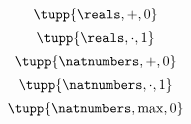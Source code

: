 {\begin{forslides}
\begin{equation}
        \end{equation}
        \begin{equation}
            \label{eq:example-monoid-reals-plus-zero}
            \tupp{\reals, +, 0}
        \end{equation}
        \begin{equation}
            \label{eq:example-monoid-reals-mult-one}
            \tupp{\reals, \cdot, 1}
        \end{equation}
        \begin{equation}
            \label{eq:example-monoid-nats-plus-zero}
            \tupp{\natnumbers, +, 0}
        \end{equation}
        \begin{equation}
            \label{eq:example-monoid-nats-mult-one}
            \tupp{\natnumbers, \cdot, 1}
        \end{equation}
        \begin{equation}
            \label{eq:example-monoid-nats-max-zero}
            \tupp{\natnumbers, \max, 0}
        \end{equation}
    \end{forslides}
}
